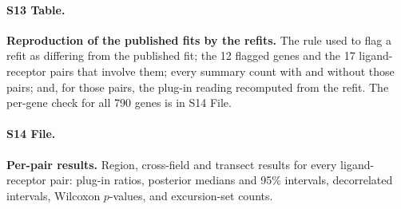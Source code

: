 \documentclass[10pt,letterpaper]{article}
\begin{document}
\paragraph*{S13 Table.}
\label{S13_Table}
\textbf{Reproduction of the published fits by the refits.} The rule used to flag a refit as differing from the published fit; the 12 flagged genes and the 17 ligand-receptor pairs that involve them; every summary count with and without those pairs; and, for those pairs, the plug-in reading recomputed from the refit. The per-gene check for all 790 genes is in S14 File.

\paragraph*{S14 File.}
\label{S14_File}
\textbf{Per-pair results.} Region, cross-field and transect results for every ligand-receptor pair: plug-in ratios, posterior medians and 95\% intervals, decorrelated intervals, Wilcoxon $p$-values, and excursion-set counts.
\end{document}
